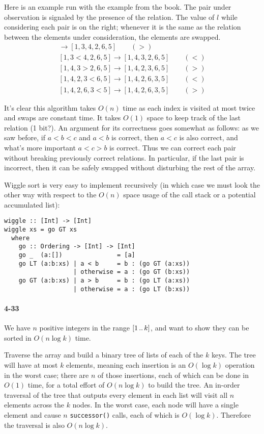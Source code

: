 \documentclass{report}
\newcommand{\ldotsTwo}{%
  \mathinner{{\ldotp}{\ldotp}}%
}
\newcommand{\li}{\lstinline}
\begin{document}
Here is an example run with the example from the book. The pair under observation is signaled by the presence of the relation. The value of $l$ while considering each pair is on the right; whenever it is the same as the relation between the elements under consideration, the elements are swapped.
\begin{gather*}
	[3 > 1,4,2,6,5] \to [1,3,4,2,6,5] \qquad (>)\\
	[1,3 < 4,2,6,5] \to [1,4,3,2,6,5] \qquad (<)\\
	[1,4,3 > 2,6,5] \to [1,4,2,3,6,5] \qquad (>)\\
	[1,4,2,3 < 6,5] \to [1,4,2,6,3,5] \qquad (<)\\
	[1,4,2,6,3 < 5] \to [1,4,2,6,3,5] \qquad (>)
\end{gather*}

It's clear this algorithm takes $O(n)$ time as each index is visited at most twice and swaps are constant time. It takes $O(1)$ space to keep track of the last relation (1 bit?). An argument for its correctness goes somewhat as follows: as we saw before, if $a < b < c$ and $a < b$ is correct, then $a < c$ is also correct, and what's more important $a < c > b$ is correct. Thus we can correct each pair without breaking previously correct relations. In particular, if the last pair is incorrect, then it can be safely swapped without disturbing the rest of the array.

\smallskip

Wiggle sort is very easy to implement recursively (in which case we must look the other way with respect to the $O(n)$ space usage of the call stack or a potential accumulated list):
\begin{lstlisting}
wiggle :: [Int] -> [Int]
wiggle xs = go GT xs
  where
    go :: Ordering -> [Int] -> [Int]
    go _  (a:[])               = [a]
    go LT (a:b:xs) | a < b     = b : (go GT (a:xs))
                   | otherwise = a : (go GT (b:xs))
    go GT (a:b:xs) | a > b     = b : (go LT (a:xs))
                   | otherwise = a : (go LT (b:xs))
\end{lstlisting}

\paragraph{4-33} We have $n$ positive integers in the range $[1\ldotsTwo k]$, and want to show they can be sorted in $O(n\log k)$ time.

Traverse the array and build a binary tree of lists of each of the $k$ keys. The tree will have at most $k$ elements, meaning each insertion is an $O(\log k)$ operation in the worst case; there are $n$ of those insertions, each of which can be done in $O(1)$ time, for a total effort of $O(n\log k)$ to build the tree. An in-order traversal of the tree that outputs every element in each list will visit all $n$ elements across the $k$ nodes. In the worst case, each node will have a single element and cause $n$ \li!successor()! calls, each of which is $O(\log k)$. Therefore the traversal is also $O(n\log k)$.
\end{document}
